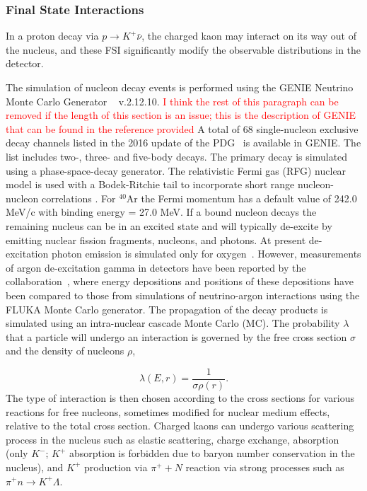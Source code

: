 \subsubsection{Final State Interactions}
\label{sec:final-state-interactions}

In a proton decay via $p\rightarrow K^{+} \bar{\nu}$, the charged kaon may interact on its way out of the nucleus, and these FSI significantly modify the observable distributions in the detector.

The simulation of nucleon decay events is performed using the GENIE Neutrino Monte Carlo Generator ~\cite{Andreopoulos:2009rq} v.2.12.10. 
\textcolor{red}{I think the rest of this paragraph can be removed if the length of this section is an issue; this is the description of GENIE that can be found in the reference provided}
A total of 68 single-nucleon exclusive decay channels listed in the 2016 update of the PDG~\cite{Patrignani:2016xqp} is available in GENIE. The list includes two-, three- and five-body decays. 
The primary decay is simulated using a phase-space-decay generator. 
The relativistic Fermi gas (RFG) nuclear model is used with a Bodek-Ritchie  tail to incorporate short range nucleon-nucleon correlations \cite{Bodek:1981wr}. 
For $^{40}$Ar the Fermi momentum has a default value of 242.0 MeV/c with binding energy = 27.0 MeV. 
If a bound nucleon decays the remaining nucleus can be in an excited state and will typically de-excite by emitting nuclear fission fragments, nucleons, and photons. At present de-excitation photon emission is simulated only for oxygen~\cite{Andreopoulos:2015wxa}.  However, measurements of argon de-excitation gamma in \lartpc detectors have been reported by the \argoneut collaboration~\cite{Acciarri:2018myr},
where energy depositions and positions of these depositions have been compared to those from simulations of neutrino-argon interactions using the FLUKA Monte Carlo generator.
The propagation of the decay products is simulated using an intra-nuclear cascade Monte Carlo (MC). The probability $\lambda$ that a particle will undergo an interaction is governed by the free cross section $\sigma$ and the density of nucleons $\rho$,

\begin{equation}
\lambda(E,r)= \frac{1}{\sigma \rho(r)}.
\end{equation}
The type of interaction is then chosen according to the cross sections for various reactions for free nucleons, sometimes modified for nuclear medium effects, relative to the total cross section. Charged kaons can undergo various scattering process in the nucleus such as elastic scattering, charge exchange, absorption (only $K^{-}$; $K^{+}$ absorption is forbidden due to baryon number conservation in the nucleus), and $K^{+}$ production via $\pi^{+}+N$ reaction via strong processes such as $\pi^{+}n \rightarrow K^{+} \Lambda$.


